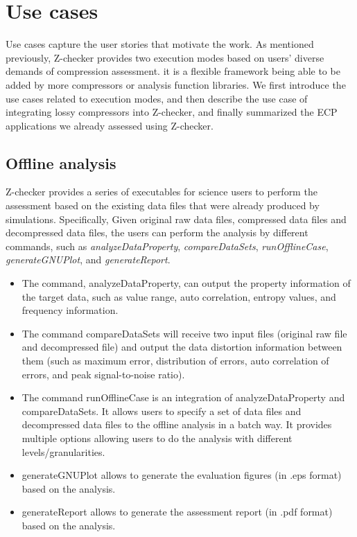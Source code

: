 \section{Use cases}

Use cases capture the user stories that motivate the work. As mentioned previously, Z-checker provides two execution modes based on users' diverse demands of compression assessment. it is a flexible framework being able to be added by more compressors or analysis function libraries. We first introduce the use cases related to execution modes, and then describe the use case of integrating lossy compressors into Z-checker, and finally summarized the ECP applications we already assessed using Z-checker.

\subsection{Offline analysis}

Z-checker provides a series of executables for science users to perform the assessment based on the existing data files that were already produced by simulations. Specifically, Given original raw data files, compressed data files and decompressed data files, the users can perform the analysis by different commands, such as \emph{analyzeDataProperty}, \emph{compareDataSets}, \emph{runOfflineCase}, \emph{generateGNUPlot}, and \emph{generateReport}.
\begin{itemize}
  \item The command, analyzeDataProperty, can output the property information of the target data, such as value range, auto correlation, entropy values, and frequency information.
  \item The command compareDataSets will receive two input files (original raw file and decompressed file) and output the data distortion information between them (such as maximum error, distribution of errors, auto correlation of errors, and peak signal-to-noise ratio).
  \item The command runOfflineCase is an integration of analyzeDataProperty and compareDataSets. It allows users to specify a set of data files and decompressed data files to the offline analysis in a batch way. It provides multiple options allowing users to do the analysis with different levels/granularities.
  \item generateGNUPlot allows to generate the evaluation figures (in .eps format) based on the analysis.
  \item generateReport allows to generate the assessment report (in .pdf format) based on the analysis.
\end{itemize}

